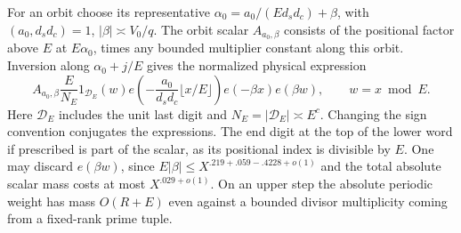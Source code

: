 \documentclass[11pt,a4paper]{article}
\theoremstyle{paperplain}
\numberwithin{equation}{section}
\begin{document}
For an orbit choose its representative
$\alpha_0=a_0/(E d_sd_c)+\beta$, with $(a_0,d_sd_c)=1$,
$|\beta|\asymp V_0/q$. The orbit scalar $A_{a_0,\beta}$ consists
of the positional factor above $E$ at $E\alpha_0$, times any
bounded multiplier constant along this orbit. Inversion along
$\alpha_0+j/E$ gives the normalized physical expression
\[
 A_{a_0,\beta}\frac{E}{N_E}1_{\mathcal D_E}(w)
 e\!\left(-\frac{a_0}{d_sd_c}\lfloor x/E\rfloor\right)
 e(-\beta x)e(\beta w),\qquad w=x\bmod E .
\]
Here $\mathcal D_E$ includes the unit last digit and
$N_E=|\mathcal D_E|\asymp E^c$. Changing the sign convention
conjugates the expressions. The end digit at the top of the lower
word if prescribed is part of the scalar, as its positional index
is divisible by $E$. One may discard $e(\beta w)$, since
$E|\beta|\le X^{.219+.059-.4228+o(1)}$ and the total absolute
scalar mass costs at most $X^{.029+o(1)}$. On an upper step the
absolute periodic weight has mass $O(R+E)$ even against a bounded
divisor multiplicity coming from a fixed-rank prime tuple.
\end{document}
